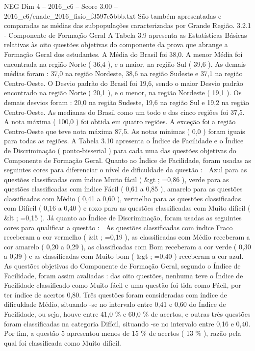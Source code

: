 \begin{textsample}{NEG Dim 4 – 2016\_c6 – Score 3.00 – 2016\_c6/enade\_2016\_fisio\_f3597e5bbb.txt}
São também apresentadas e comparadas as médias das subpopulações caracterizadas por Grande Região. 3.2.1 - Componente de Formação Geral A Tabela 3.9 apresenta as Estatísticas Básicas relativas às oito questões objetivas do componente da prova que abrange a Formação Geral dos estudantes.
A Média do Brasil foi 38,0.
A menor Média foi encontrada na região Norte ( 36,4 ), e a maior, na região Sul ( 39,6 ).
As demais médias foram : 37,0 na região Nordeste, 38,6 na região Sudeste e 37,1 na região Centro-Oeste.
O Desvio padrão do Brasil foi 19,6, sendo o maior Desvio padrão encontrado na região Norte ( 20,1 ), e o menor, na região Nordeste ( 19,1 ).
Os demais desvios foram : 20,0 na região Sudeste, 19,6 na região Sul e 19,2 na região Centro-Oeste.
As medianas do Brasil como um todo e das cinco regiões foi 37,5.
A nota máxima ( 100,0 ) foi obtida em quatro regiões.
A exceção foi a região Centro-Oeste que teve nota máxima 87,5.
As notas mínimas ( 0,0 ) foram iguais para todas as regiões.
A Tabela 3.10 apresenta o Índice de Facilidade e o Índice de Discriminação ( ponto-bisserial ) para cada uma das questões objetivas do Componente de Formação Geral.
Quanto ao Índice de Facilidade, foram usadas as seguintes cores para diferenciar o nível de dificuldade da questão :  Azul para as questões classificadas com índice Muito fácil ( \&gt ; =0,86 ), verde para as questões classificadas com índice Fácil ( 0,61 a 0,85 ), amarelo para as questões classificadas com Médio ( 0,41 a 0,60 ), vermelho para as questões classificadas com Difícil ( 0,16 a 0,40 ) e roxo para as questões classificadas com Muito difícil ( \&lt ; =0,15 ).
Já quanto ao Índice de Discriminação, foram usadas as seguintes cores para qualificar a questão :  As questões classificadas com índice Fraco receberam a cor vermelho ( \&lt ; =0,19 ), as classificadas com Médio receberam a cor amarelo ( 0,20 a 0,29 ), as classificadas com Bom receberam a cor verde ( 0,30 a 0,39 ) e as classificadas com Muito bom ( \&gt ; =0,40 ) receberam a cor azul.
As questões objetivas do Componente de Formação Geral, segundo o Índice de Facilidade, foram assim avaliadas : das oito questões, nenhuma teve o Índice de Facilidade classificado como Muito fácil e uma questão foi tida como Fácil, por ter índice de acertos 0,80.
Três questões foram consideradas com índice de dificuldade Médio, situando -se no intervalo entre 0,41 e 0,60 do Índice de Facilidade, ou seja, houve entre 41,0 \% e 60,0 \% de acertos, e outras três questões foram classificadas na categoria Difícil, situando -se no intervalo entre 0,16 e 0,40.
Por fim, a questão 5 apresentou menos de 15 \% de acertos ( 13 \% ), razão pela qual foi classificada como Muito difícil.

\end{textsample}
